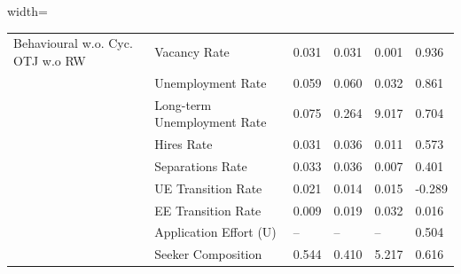 \begin{table}[ht]
\begin{adjustbox}{width=\textwidth}
\begin{tabular}{llllll}
Behavioural w.o. Cyc. OTJ w.o RW & Vacancy Rate & 0.031 & 0.031 & \cellcolor{yellow!25}0.001 & \cellcolor{yellow!25}0.936 \\
 & Unemployment Rate & 0.059 & 0.060 & 0.032 & \cellcolor{black!30}0.861 \\
 & Long-term Unemployment Rate & 0.075 & 0.264 & \cellcolor{red!25}9.017 & 0.704 \\
 & Hires Rate & 0.031 & 0.036 & 0.011 & \cellcolor{yellow!25}0.573 \\
 & Separations Rate & 0.033 & 0.036 & 0.007 & 0.401 \\
 & UE Transition Rate & 0.021 & 0.014 & \cellcolor{red!25}0.015 & -0.289 \\
 & EE Transition Rate & 0.009 & 0.019 & \cellcolor{red!25}0.032 & 0.016 \\
 & Application Effort (U) & -- & -- & -- & \cellcolor{red!25}0.504 \\
 & Seeker Composition & 0.544 & 0.410 & \cellcolor{red!25}5.217 & 0.616 \\
\bottomrule
\end{tabular}
\end{adjustbox}
\end{table}

